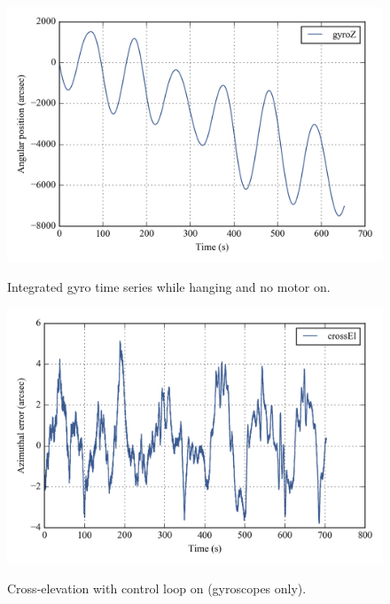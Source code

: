 \begin{figure}[!ht]
\begin{center}
\includegraphics{Figures/integral_lifted_gyroZ.png}
\label{fig:intgralgyroZ400}
\caption[Integrated gyro time series while hanging]{Integrated gyro time series while hanging and no motor on.}
\end{center}
\end{figure}
\begin{figure}[!h]
\begin{center}
\includegraphics[width=\textwidth]{Figures/simplePlot_crossEl.png}
\label{fig:crossEl400}
\caption[Cross-elevation with control loop on]{Cross-elevation with control loop on (gyroscopes only).}
\end{center}
\end{figure}





